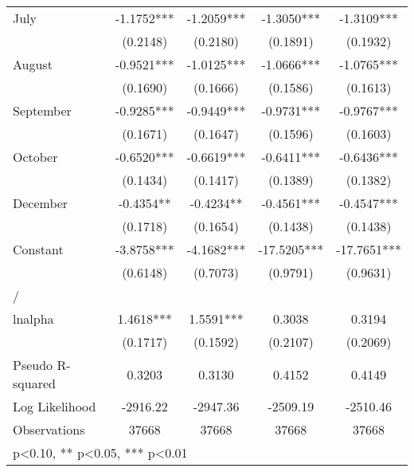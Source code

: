 \begin{table}[htbp]
\begin{tabular}{l*{4}{c}}
July                &     -1.1752***&     -1.2059***&     -1.3050***&     -1.3109***\\
                    &    (0.2148)   &    (0.2180)   &    (0.1891)   &    (0.1932)   \\
August              &     -0.9521***&     -1.0125***&     -1.0666***&     -1.0765***\\
                    &    (0.1690)   &    (0.1666)   &    (0.1586)   &    (0.1613)   \\
September           &     -0.9285***&     -0.9449***&     -0.9731***&     -0.9767***\\
                    &    (0.1671)   &    (0.1647)   &    (0.1596)   &    (0.1603)   \\
October             &     -0.6520***&     -0.6619***&     -0.6411***&     -0.6436***\\
                    &    (0.1434)   &    (0.1417)   &    (0.1389)   &    (0.1382)   \\
December            &     -0.4354** &     -0.4234** &     -0.4561***&     -0.4547***\\
                    &    (0.1718)   &    (0.1654)   &    (0.1438)   &    (0.1438)   \\
Constant            &     -3.8758***&     -4.1682***&    -17.5205***&    -17.7651***\\
                    &    (0.6148)   &    (0.7073)   &    (0.9791)   &    (0.9631)   \\
\hline
/                   &               &               &               &               \\
lnalpha             &      1.4618***&      1.5591***&      0.3038   &      0.3194   \\
                    &    (0.1717)   &    (0.1592)   &    (0.2107)   &    (0.2069)   \\
\hline
Pseudo R-squared    &      0.3203   &      0.3130   &      0.4152   &      0.4149   \\
Log Likelihood      &    -2916.22   &    -2947.36   &    -2509.19   &    -2510.46   \\
Observations        &       37668   &       37668   &       37668   &       37668   \\
\hline\hline
\multicolumn{5}{l}{\footnotesize * p<0.10, ** p<0.05, *** p<0.01}\\
\end{tabular}
\end{table}
